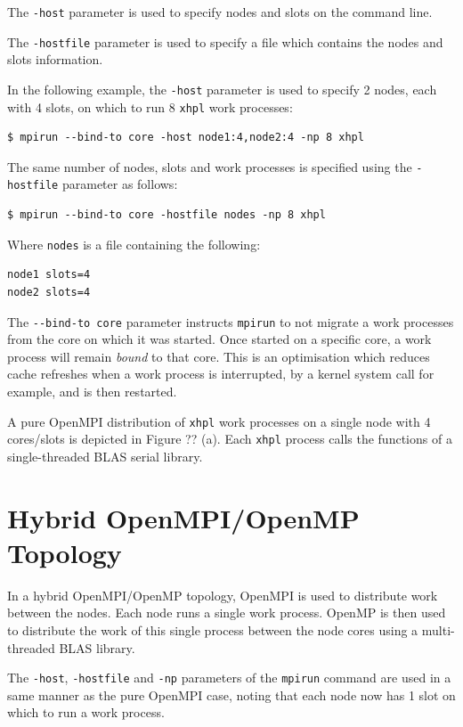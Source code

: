 \documentclass{report}
\begin{document}
The \verb|-host| parameter is used to specify nodes and slots on the command line.

The \verb|-hostfile| parameter is used to specify a file which contains the nodes and slots information.

In the following example, the \verb|-host| parameter is used to specify 2 nodes, each with 4 slots, on which to run 8 \verb|xhpl| work processes:

\lstset{style=type}
\begin{lstlisting}
$ mpirun --bind-to core -host node1:4,node2:4 -np 8 xhpl
\end{lstlisting}

The same number of nodes, slots and work processes is specified using the \verb|-hostfile| parameter as follows:

\lstset{style=type}
\begin{lstlisting}
$ mpirun --bind-to core -hostfile nodes -np 8 xhpl
\end{lstlisting}

Where \verb|nodes| is a file containing the following:

\lstset{style=listing}
\begin{lstlisting}[numbers=none, caption=nodes]
node1 slots=4
node2 slots=4
\end{lstlisting}

The \verb|--bind-to core| parameter instructs \verb|mpirun| to not migrate a work processes from the core on which it was started. Once started on a specific core, a work process will remain \emph{bound} to that core. This is an optimisation which reduces cache refreshes when a work process is interrupted, by a kernel system call for example, and is then restarted.

A pure OpenMPI distribution of \verb|xhpl| work processes on a single node with 4 cores/slots is depicted in Figure ?? (a). Each \verb|xhpl| process calls the functions of a single-threaded BLAS serial library.


%
%
\section{Hybrid OpenMPI/OpenMP Topology}
In a hybrid OpenMPI/OpenMP topology, OpenMPI is used to distribute work between the nodes. Each node runs a single work process. OpenMP is then used to distribute the work of this single process between the node cores using a multi-threaded BLAS library.

The \verb|-host|, \verb|-hostfile| and \verb|-np| parameters of the \verb|mpirun| command are used in a same manner as the pure OpenMPI case, noting that each node now has 1 slot on which to run a work process.
\end{document}
